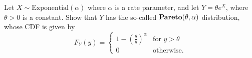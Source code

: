 

\begin{example}
Let $X\sim\text{Exponential}(\alpha)$ where $\alpha$ is a rate parameter, and let $Y=\theta e^X$, where $\theta>0$ is a constant. Show that $Y$ has the so-called $\text{\emph{Pareto}}(\theta,\alpha)$ distribution, whose CDF is given by
\[
F_Y(y)= \begin{cases}
		1 - \left(\frac{\theta}{y}\right)^{\alpha}	& \text{for } y > \theta \\
		0											& \text{otherwise.}
	\end{cases}	
\]
\end{example}

